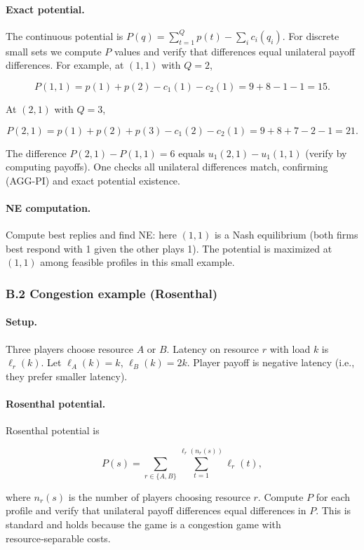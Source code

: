 \documentclass[11pt]{article}
\begin{document}
\paragraph{Exact potential.} The continuous potential is
\(P(q)=\sum_{t=1}^{Q} p(t) - \sum_i c_i(q_i)\). For discrete small sets we
compute \(P\) values and verify that differences equal unilateral payoff
differences. For example, at \((1,1)\) with \(Q=2\),


\[
P(1,1)=p(1)+p(2)-c_1(1)-c_2(1)=9+8-1-1=15.
\]


At \((2,1)\) with \(Q=3\),


\[
P(2,1)=p(1)+p(2)+p(3)-c_1(2)-c_2(1)=9+8+7-2-1=21.
\]


The difference \(P(2,1)-P(1,1)=6\) equals \(u_1(2,1)-u_1(1,1)\) (verify by
computing payoffs). One checks all unilateral differences match, confirming
(AGG-PI) and exact potential existence.

\paragraph{NE computation.} Compute best replies and find NE: here \((1,1)\)
is a Nash equilibrium (both firms best respond with 1 given the other plays
1). The potential is maximized at \((1,1)\) among feasible profiles in this
small example.

\subsubsection{B.2 Congestion example (Rosenthal)}

\paragraph{Setup.} Three players choose resource \(A\) or \(B\). Latency on
resource \(r\) with load \(k\) is \(\ell_r(k)\). Let \(\ell_A(k)=k\),
\(\ell_B(k)=2k\). Player payoff is negative latency (i.e., they prefer
smaller latency).

\paragraph{Rosenthal potential.} Rosenthal potential is


\[
P(s)=\sum_{r\in\{A,B\}} \sum_{t=1}^{\ell_r(n_r(s))} \ell_r(t),
\]


where \(n_r(s)\) is the number of players choosing resource \(r\). Compute
\(P\) for each profile and verify that unilateral payoff differences equal
differences in \(P\). This is standard and holds because the game is a
congestion game with resource‑separable costs.
\end{document}
